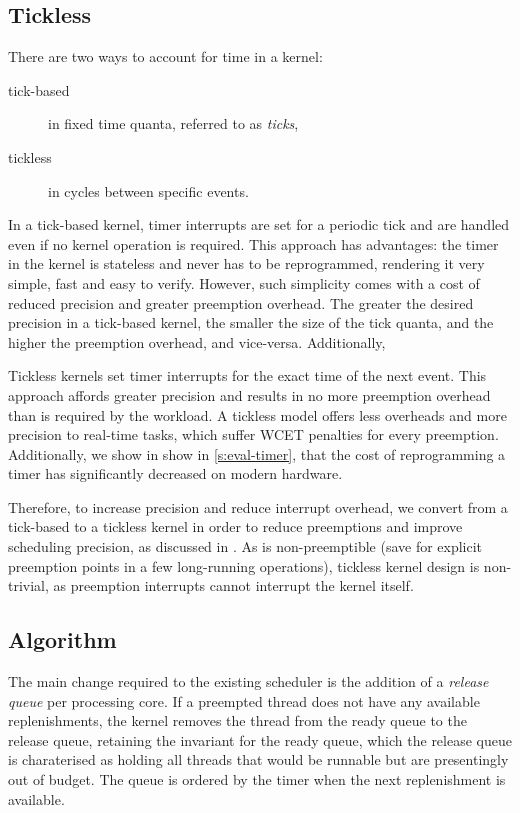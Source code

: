 \subsection{Tickless}

There are two ways to account for time in a kernel:
\begin{description}
    \item[tick-based] in fixed time quanta, referred to as \emph{ticks},
    \item[tickless] in cycles between specific events.
\end{description}

In a tick-based kernel, timer interrupts are set for a periodic tick and are
handled even if no kernel operation is required.  This approach has advantages:
the timer in the kernel is stateless and never has to be reprogrammed,
rendering it very simple, fast and easy to verify.  However, such simplicity
comes with a cost of reduced precision and greater preemption overhead.  The
greater the desired precision in a tick-based kernel, the smaller the size of
the tick quanta, and the higher the preemption overhead, and vice-versa.
Additionally,

Tickless kernels set timer interrupts for the exact time of the next event.
This approach affords greater precision and results in no more preemption
overhead than is required by the workload.  A tickless model offers less
overheads and more precision to real-time tasks, which suffer \gls{WCET}
penalties for every preemption.  Additionally, we show in show in
\cref{s:eval-timer}, that the cost of reprogramming a timer has significantly
decreased on modern hardware.

Therefore, to increase precision and reduce interrupt overhead, we convert \selfour from a tick-based
 to a tickless kernel in order to reduce preemptions and
improve scheduling precision, as discussed in .
As \selfour is non-preemptible (save for explicit preemption points in a few long-running
operations), tickless kernel design is non-trivial, as preemption interrupts cannot interrupt the
kernel itself.

\subsection{Algorithm}

The main change required to the existing scheduler is the addition of a \emph{release queue} per
processing core. If a
preempted thread does not have any available replenishments, the kernel removes the thread from the
ready queue to the release queue, retaining the invariant for the ready queue, which the release
queue is charaterised as holding all threads that would be runnable but are presentingly out of
budget. The queue is ordered by the timer when the next replenishment is available.

